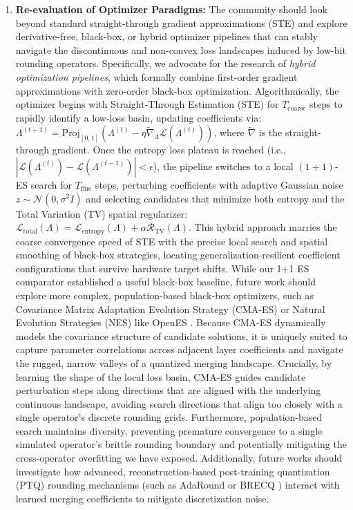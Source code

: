 \begin{enumerate}
    \item \textbf{Re-evaluation of Optimizer Paradigms:} The community should look beyond standard straight-through gradient approximations (STE) and explore derivative-free, black-box, or hybrid optimizer pipelines that can stably navigate the discontinuous and non-convex loss landscapes induced by low-bit rounding operators. Specifically, we advocate for the research of \emph{hybrid optimization pipelines}, which formally combine first-order gradient approximations with zero-order black-box optimization. Algorithmically, the optimizer begins with Straight-Through Estimation (STE) for $T_{\text{coarse}}$ steps to rapidly identify a low-loss basin, updating coefficients via: $\Lambda^{(t+1)} = \text{Proj}_{[0, 1]} \left( \Lambda^{(t)} - \eta \tilde{\nabla}_{\Lambda} \mathcal{L}(\Lambda^{(t)}) \right)$, where $\tilde{\nabla}$ is the straight-through gradient. Once the entropy loss plateau is reached (i.e., $| \mathcal{L}(\Lambda^{(t)}) - \mathcal{L}(\Lambda^{(t-1)}) | < \epsilon$), the pipeline switches to a local $(1+1)$-ES search for $T_{\text{fine}}$ steps, perturbing coefficients with adaptive Gaussian noise $z \sim \mathcal{N}(0, \sigma^2 I)$ and selecting candidates that minimize both entropy and the Total Variation (TV) spatial regularizer: $\mathcal{L}_{\text{total}}(\Lambda) = \mathcal{L}_{\text{entropy}}(\Lambda) + \alpha \mathcal{R}_{\text{TV}}(\Lambda)$. This hybrid approach marries the coarse convergence speed of STE with the precise local search and spatial smoothing of black-box strategies, locating generalization-resilient coefficient configurations that survive hardware target shifts. While our 1+1 ES comparator established a useful black-box baseline, future work should explore more complex, population-based black-box optimizers, such as Covariance Matrix Adaptation Evolution Strategy (CMA-ES) \cite{hansen2001cma} or Natural Evolution Strategies (NES) like OpenES \cite{salimans2017evolution}. Because CMA-ES dynamically models the covariance structure of candidate solutions, it is uniquely suited to capture parameter correlations across adjacent layer coefficients and navigate the rugged, narrow valleys of a quantized merging landscape. Crucially, by learning the shape of the local loss basin, CMA-ES guides candidate perturbation steps along directions that are aligned with the underlying continuous landscape, avoiding search directions that align too closely with a single operator's discrete rounding grids. Furthermore, population-based search maintains diversity, preventing premature convergence to a single simulated operator's brittle rounding boundary and potentially mitigating the cross-operator overfitting we have exposed. Additionally, future works should investigate how advanced, reconstruction-based post-training quantization (PTQ) rounding mechanisms (such as AdaRound \cite{nagel2020adaround} or BRECQ \cite{li2021brecq}) interact with learned merging coefficients to mitigate discretization noise.

\end{enumerate}
